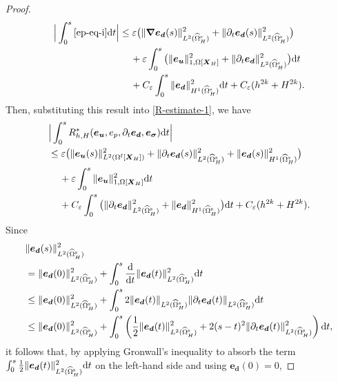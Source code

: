 \documentclass[11pt,reqno]{amsart}
\theoremstyle{definition}
\theoremstyle{plain}
\numberwithin{theorem}{section}
\numberwithin{proposition}{section}
\numberwithin{lemma}{section}
\numberwithin{equation}{section}
\newcommand{\bs}[1]{\boldsymbol{#1}}
\newcommand{\uu}[1]  {{\bs{#1}} }
\newcommand{\dep}{{{\bs{d}}}}
\newcommand{\grad}   { \uu{\nabla}    }
\def\d{\mathrm{d}}
\renewcommand{\(}{\bigl(}
\renewcommand{\)}{\bigr)}
\begin{document}
\begin{proof}
\begin{align}
\Big| \int_0^s \eqref{ep-eq-i} \d t \Big| 
&\le \varepsilon \big( \|\grad{\bs e}_{\bs d}(s)\|_{L^2(\widehat\Omega^{\rm s}_H)}^2 + \|\partial_t{\bs e}_{\bs d}(s)\|_{L^2(\widehat\Omega^{\rm s}_H)}^2 \big) \notag\\
&\quad\, 
+  \varepsilon\int_0^s \big(\| {\bs e}_{\bs u}  \|_{1,\Omega[{\bs X}_H]}^2 + \|\partial_t{\bs e}_\dep\|_{L^2(\widehat{\Omega}^{\rm s}_H)}^2 \big) \d t\notag\\
&\quad\,
+ C_\varepsilon \int_0^s \|{\bs e}_\dep\|_{H^1(\widehat{\Omega}^{\rm s}_H)}^2 \d t 
+ C_\varepsilon(h^{2k} + H^{2k}) .  
\end{align}
Then, substituting this result into \eqref{R-estimate-1}, we have 
\begin{align}\label{R-estimate-2}
&\Big| \int_0^s R_{h,H}^*({\bs e}_{\bs u}, e_p, \partial_t{\bs e}_{\bs d}, {\bs e}_{{\bs \sigma} }) \d t\Big| \notag\\
&\le \varepsilon \big(\|{\bs e}_{\bs u}(s)\|_{L^2(\Omega^{\rm f}[\bs X_H])}^2 + \|\partial_t{\bs e}_\dep(s)\|_{L^2(\widehat{\Omega}^{\rm s}_H)}^2 + \|{\bs e}_\dep(s)\|_{H^1(\widehat{\Omega}^{\rm s}_H)}^2 \big) \notag\\
&\quad\, 
+  \varepsilon\int_0^s \| {\bs e}_{\bs u}  \|_{1,\Omega[{\bs X}_H]}^2  \d t \notag\\
&\quad\,
+ C_\varepsilon \int_0^s \big( \|\partial_t{\bs e}_\dep\|_{L^2(\widehat{\Omega}^{\rm s}_H)}^2 + \|{\bs e}_\dep\|_{H^1(\widehat{\Omega}^{\rm s}_H)}^2 \big)  \d t 
+ C_\varepsilon(h^{2k} + H^{2k}) .  
\end{align}
Since
\begin{align*} 
&\|{\bs e}_{\bs d}(s)\|_{L^2(\widehat{\Omega}^{\rm s}_H)}^2 \notag\\
&= \|{\bs e}_{\bs d}(0)\|_{L^2(\widehat{\Omega}^{\rm s}_H)}^2
+ \int_0^s \frac{\d}{\d t}\|{\bs e}_{\bs d}(t)\|_{L^2(\widehat{\Omega}^{\rm s}_H)}^2 \d t \notag\\
&\le \|{\bs e}_{\bs d}(0)\|_{L^2(\widehat{\Omega}^{\rm s}_H)}^2
+ \int_0^s 2\|{\bs e}_{\bs d}(t)\|_{L^2(\widehat{\Omega}^{\rm s}_H)}
\|\partial_t{\bs e}_{\bs d}(t)\|_{L^2(\widehat{\Omega}^{\rm s}_H)} \d t \notag\\
&\le \|{\bs e}_{\bs d}(0)\|_{L^2(\widehat{\Omega}^{\rm s}_H)}^2
+ \int_0^s \left(\frac12\|{\bs e}_{\bs d}(t)\|_{L^2(\widehat{\Omega}^{\rm s}_H)}^2+
2(s-t)^2\|\partial_t{\bs e}_{\bs d}(t)\|_{L^2(\widehat{\Omega}^{\rm s}_H)}^2\right)\d t , 
\end{align*}
it follows that, by applying Gronwall's inequality to absorb the term $\int_0^s\frac12\|{\bs e}_{\bs d}(t)\|_{L^2(\widehat{\Omega}^{\rm s}_H)}^2\d t$ on the left-hand side and using ${\bs e}_{\bs d}(0)=0$, 

\end{proof}
\end{document}
